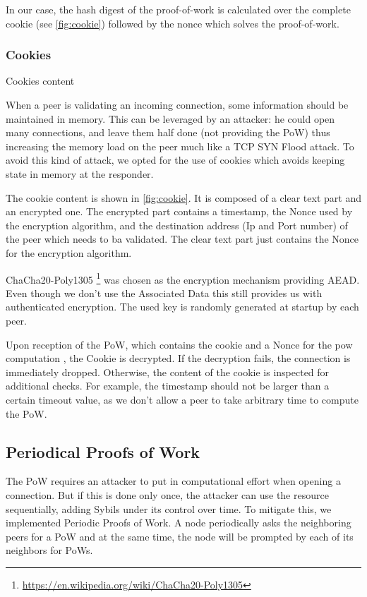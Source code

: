 \documentclass[a4paper,english,10pt,NET]{tumarticle}
\begin{document}
In our case, the hash digest of the proof-of-work is calculated over the complete cookie (see \cref{fig:cookie}) followed by the nonce which solves the proof-of-work.

\subsubsection{Cookies}

\begin{table}
	\centering
	
	\caption{Cookies content}
	\label{fig:cookie}
\end{table}

When a peer is validating an incoming connection, some information should be maintained in memory. This can be leveraged by an attacker: he could open many connections, and leave them half done (not providing the PoW) thus increasing the memory load on the peer much like a TCP SYN Flood attack. To avoid this kind of attack, we opted for the use of cookies which avoids keeping state in memory at the responder.

The cookie content is shown in \cref{fig:cookie}. It is composed of a clear text part and an encrypted one. The encrypted part contains a timestamp, the Nonce used by the encryption algorithm, and the destination address (Ip and Port number) of the peer which needs to ba validated. The clear text part just contains the Nonce for the encryption algorithm.

ChaCha20-Poly1305 \footnote{\url{https://en.wikipedia.org/wiki/ChaCha20-Poly1305}} was chosen as the encryption mechanism providing AEAD. Even though we don't use the Associated Data this still provides us with authenticated encryption. The used key is randomly generated at startup by each peer.

Upon reception of the PoW, which contains the cookie and a Nonce for the pow computation \label{tab:pow}, the Cookie is decrypted. If the decryption fails, the connection is immediately dropped. Otherwise, the content of the cookie is inspected for additional checks. For example, the timestamp should not be larger than a certain timeout value, as we don't allow a peer to take arbitrary time to compute the PoW.

\subsection{Periodical Proofs of Work} \label{sec:periodic}

The PoW requires an attacker to put in computational effort when opening a connection. But if this is done only once, the attacker can use the resource sequentially, adding Sybils under its control over time. To mitigate this, we implemented Periodic Proofs of Work. A node periodically asks the neighboring peers for a PoW and at the same time, the node will be prompted by each of its neighbors for PoWs. 
\end{document}
